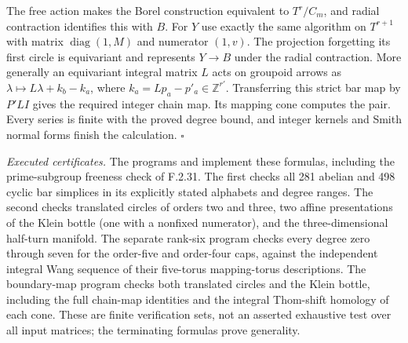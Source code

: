 The free action makes the Borel construction equivalent to
$T^r/C_m$, and radial contraction identifies this with $B$.
For $Y$ use exactly the same algorithm on $T^{r+1}$ with
matrix $\operatorname{diag}(1,M)$ and numerator $(1,v)$.
The projection forgetting its first circle is equivariant and
represents $Y\to B$ under the radial contraction.
More generally an equivariant integral matrix $L$ acts on
groupoid arrows as
$\lambda\mapsto L\lambda+k_b-k_a$, where
$k_a=Lp_a-p'_a\in\mathbb Z^{r'}$.
Transferring this strict bar map by $P'LI$ gives the required
integer chain map.  Its mapping cone computes the pair.
Every series is finite with the proved degree bound, and
integer kernels and Smith normal forms finish the calculation.
\hfill$\square$

\emph{Executed certificates.}
The programs  and
 implement these
formulas, including the prime-subgroup freeness check of F.2.31.
The first checks all 281 abelian and 498 cyclic bar simplices
in its explicitly stated alphabets and degree ranges.
The second checks translated circles of orders two and three,
two affine presentations of the Klein bottle (one with a
nonfixed numerator), and the three-dimensional half-turn
manifold.  The separate rank-six program checks every degree
zero through seven for the order-five and order-four caps,
against the independent integral Wang sequence of their
five-torus mapping-torus descriptions.
The boundary-map program checks both translated circles and
the Klein bottle, including the full chain-map identities and
the integral Thom-shift homology of each cone.  These are
finite verification sets, not an asserted exhaustive test over
all input matrices; the terminating formulas prove generality.

